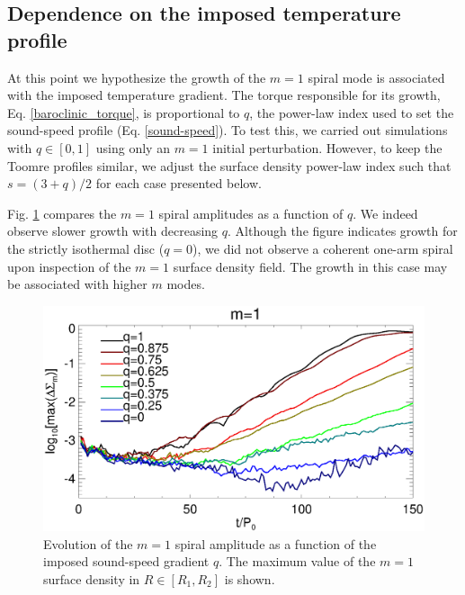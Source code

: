 
\subsection{Dependence on the imposed temperature profile} 
At this point we hypothesize the growth of the $m=1$ spiral mode is
associated with the imposed temperature gradient. The torque
responsible for its growth, Eq. \ref{baroclinic_torque}, is
proportional to $q$, the power-law index used to set the sound-speed
profile (Eq. \ref{sound-speed}). To test this, we carried out
simulations with $q\in[0,1]$ using only an $m=1$ initial 
perturbation. However, to keep the Toomre profiles similar, we adjust
the surface density power-law index such that $s = (3+q)/2$ for each
case presented below. %

Fig. \ref{fargo_varq} compares the $m=1$ spiral amplitudes as a
function of $q$. We indeed observe slower growth with decreasing
$q$. Although the figure indicates growth for the strictly isothermal
disc ($q=0$), we did not observe a coherent one-arm spiral upon
inspection of the $m=1$ surface density field. The growth in this case
may be associated with higher $m$ modes.  

\begin{figure}
  \includegraphics[width=\linewidth]{figures/m1_analysis_plot_fargo_varq.ps}   
  \caption{Evolution of the $m=1$ spiral amplitude as a function of
    the imposed sound-speed gradient $q$. The maximum value of the
    $m=1$ surface density in $R\in[R_1,R_2]$ is shown. 
    \label{fargo_varq}} 
\end{figure}

